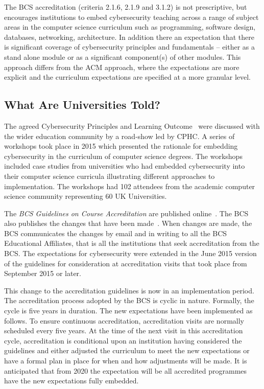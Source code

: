 \documentclass[conference]{IEEEtran}
\begin{document}
The BCS accreditation (criteria 2.1.6, 2.1.9 and 3.1.2) is not prescriptive, but encourages institutions to embed cybersecurity teaching across a range of subject areas in the computer science curriculum such as programming, software design, databases, networking, architecture. In addition there an expectation that there is significant coverage of cybersecurity principles and fundamentals -- either as a stand alone module or as a significant component(s) of other modules. This approach differs from the ACM approach, where the expectations are more explicit and the curriculum expectations are specified at a more granular level.


\subsection{What Are Universities Told?}
The agreed Cybersecurity Principles and Learning Outcome~\cite{CPHCISC2} were discussed with the wider education community by a road-show led by CPHC. A series of workshops took place in 2015 which presented the rationale for embedding cybersecurity in the curriculum of computer science degrees. The workshops included case studies from universities who had embedded cybersecurity into their computer science curricula illustrating different approaches to implementation. The workshops had 102 attendees from the academic computer science community representing 60 UK Universities. 

The {\emph{BCS Guidelines on Course Accreditation}} are published online~\cite{BCS2018a}. The BCS also publishes the changes that have been made~\cite{BCS2018b}. When changes are made, the BCS communicates the changes by email and in writing to all the BCS Educational Affiliates, that is all the institutions that seek accreditation from the BCS. The expectations for cybersecurity were extended in the June 2015 version of the guidelines for consideration at accreditation visits that took place from September 2015 or later.

This change to the accreditation guidelines is now in an implementation period. The accreditation process adopted by the BCS is cyclic in nature. Formally, the cycle is five years in duration. The new expectations have been implemented as follows. To ensure continuous accreditation, accreditation visits are normally scheduled every five years. At the time of the next visit in this accreditation cycle, accreditation is conditional upon an institution having considered the guidelines and either adjusted the curriculum to meet the new expectations or have a formal plan in place for when and how adjustments will be made.  It is anticipated that from 2020 the expectation will be all accredited programmes have the new expectations fully embedded.
\end{document}
